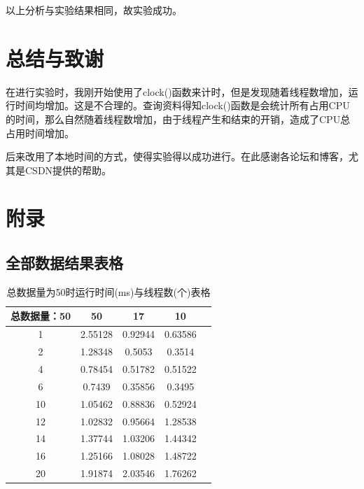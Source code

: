\documentclass[UTF8]{ctexart}
\begin{document}
以上分析与实验结果相同，故实验成功。

\section{总结与致谢}
在进行实验时，我刚开始使用了clock()函数来计时，但是发现随着线程数增加，运行时间均增加。这是不合理的。查询资料得知clock()函数是会统计所有占用CPU的时间，那么自然随着线程数增加，由于线程产生和结束的开销，造成了CPU总占用时间增加。

后来改用了本地时间的方式，使得实验得以成功进行。在此感谢各论坛和博客，尤其是CSDN提供的帮助。

\section{附录}
\subsection{全部数据结果表格}
\begin{table}[H]
    \centering
    \begin{tabular}{|c|c|c|c|c|}
        \hline
        总数据量：50& 	50& 	17& 	10\\
        \hline
        1&	2.55128&	0.92944&	0.63586\\
        \hline
        2&	1.28348&	0.5053&	0.3514\\
        \hline
        4&	0.78454&	0.51782&	0.51522\\
        \hline
        6&	0.7439&	    0.35856&	0.3495\\
        \hline
        10&	1.05462&	0.88836&	0.52924\\
        \hline
        12&	1.02832&	0.95664&	1.28538\\
        \hline
        14&	1.37744&	1.03206&	1.44342\\
        \hline
        16&	1.25166&	1.08028&	1.48722\\
        \hline
        20&	1.91874&	2.03546&	1.76262\\
        \hline
    \end{tabular}
    \caption{总数据量为50时运行时间(ms)与线程数(个)表格}
\end{table}
\end{document}
